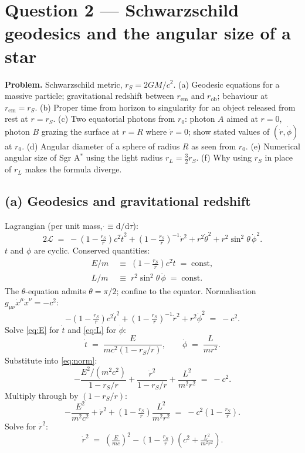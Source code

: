 \documentclass[11pt]{article}
\newcommand{\de}{\mathrm{d}}
\begin{document}
\section*{Question 2 --- Schwarzschild geodesics and the angular size of a star}

\textbf{Problem.} Schwarzschild metric, $r_S=2GM/c^2$. (a) Geodesic equations for a massive particle; gravitational redshift between $r_\text{em}$ and $r_\text{ob}$; behaviour at $r_\text{em}=r_S$. (b) Proper time from horizon to singularity for an object released from rest at $r=r_S$. (c) Two equatorial photons from $r_0$: photon $A$ aimed at $r=0$, photon $B$ grazing the surface at $r=R$ where $\dot r=0$; show stated values of $(\dot r,\dot\phi)$ at $r_0$. (d) Angular diameter of a sphere of radius $R$ as seen from $r_0$. (e) Numerical angular size of Sgr A$^*$ using the light radius $r_L=\tfrac32 r_S$. (f) Why using $r_S$ in place of $r_L$ makes the formula diverge.

\subsection*{(a) Geodesics and gravitational redshift}

Lagrangian (per unit mass, $\dot{}\equiv \de/\de\tau$):
\[
2\mathcal L \;=\; -\!\left(1-\tfrac{r_S}{r}\right)c^2\dot t^2 + \left(1-\tfrac{r_S}{r}\right)^{-1}\dot r^2 + r^2\dot\theta^2 + r^2\sin^2\theta\,\dot\phi^2.
\]
$t$ and $\phi$ are cyclic. Conserved quantities:
\begin{align}
E/m &\;\equiv\; \left(1-\tfrac{r_S}{r}\right)c^2\dot t \;=\; \text{const},
\label{eq:E}\\
L/m &\;\equiv\; r^2\sin^2\theta\,\dot\phi \;=\; \text{const}.
\label{eq:L}
\end{align}
The $\theta$-equation admits $\theta=\pi/2$; confine to the equator. Normalisation $g_{\mu\nu}\dot x^\mu\dot x^\nu=-c^2$:
\begin{equation}
-\!\left(1-\tfrac{r_S}{r}\right)c^2\dot t^2 + \left(1-\tfrac{r_S}{r}\right)^{-1}\dot r^2 + r^2\dot\phi^2 \;=\; -c^2.
\label{eq:norm}
\end{equation}
Solve \eqref{eq:E} for $\dot t$ and \eqref{eq:L} for $\dot\phi$:
\[
\dot t \;=\; \frac{E}{mc^2(1-r_S/r)},\qquad \dot\phi \;=\; \frac{L}{mr^2}.
\]
Substitute into \eqref{eq:norm}:
\[
-\frac{E^2/(m^2 c^2)}{1-r_S/r} + \frac{\dot r^2}{1-r_S/r} + \frac{L^2}{m^2 r^2} \;=\; -c^2.
\]
Multiply through by $(1-r_S/r)$:
\[
-\frac{E^2}{m^2 c^2} + \dot r^2 + \left(1-\tfrac{r_S}{r}\right)\!\frac{L^2}{m^2 r^2} \;=\; -c^2\!\left(1-\tfrac{r_S}{r}\right).
\]
Solve for $\dot r^2$:
\[
\dot r^2 \;=\; \left(\tfrac{E}{mc}\right)^2 - \left(1-\tfrac{r_S}{r}\right)\!\left(c^2 + \tfrac{L^2}{m^2 r^2}\right).
\]
\end{document}
